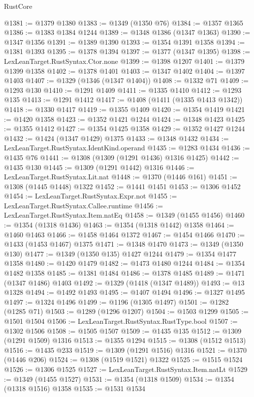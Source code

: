 \begin{lexlean}{RustCore}
\begin{coremodule}
@1381 := @1379 @1380
@1383 := @1349 (@1350 @76)
@1384 := @1357 @1365
@1386 := @1383 @1384 @1244
@1389 := @1348 @1386 (@1347 @1363)
@1390 := @1347 @1356
@1391 := @1389 @1390
@1393 := @1354 @1391 @1358
@1394 := @1381 @1393
@1395 := @1378 @1394
@1397 := @1377 (@1347 @1395)
@1398 := LexLeanTarget.RustSyntax.Ctor.none
@1399 := @1398 @1207
@1401 := @1379 @1399 @1358
@1402 := @1378 @1401
@1403 := @1347 @1402
@1404 := @1397 @1403
@1407 := @1329 (@1346 (@1347 @1404))
@1408 := @1332 @71
@1409 := @1293 @130
@1410 := @1291 @1409
@1411 := @1335 @1410
@1412 := @1293 @135
@1413 := @1291 @1412
@1417 := @1408 (@1411 (@1335 @1413 @1342))
@1418 := @1330 @1417
@1419 := @1355 @1409
@1420 := @1354 @1419
@1421 := @1420 @1358
@1423 := @1352 @1421 @1244
@1424 := @1348 @1423
@1425 := @1355 @1412
@1427 := @1354 @1425 @1358
@1429 := @1352 @1427 @1244
@1432 := @1424 (@1347 @1429) @1375
@1433 := @1348 @1432
@1434 := LexLeanTarget.RustSyntax.IdentKind.operand
@1435 := @1283 @1434
@1436 := @1435 @76
@1441 := @1308 (@1309 (@1291 @1436) @1316 @1425)
@1442 := @1435 @130
@1445 := @1309 (@1291 @1442) @1316
@1446 := LexLeanTarget.RustSyntax.Lit.nat
@1448 := @1370 (@1446 @161)
@1451 := @1308 (@1445 @1448) @1322
@1452 := @1441 @1451
@1453 := @1306 @1452
@1454 := LexLeanTarget.RustSyntax.Expr.not
@1455 := LexLeanTarget.RustSyntax.Callee.runtime
@1456 := LexLeanTarget.RustSyntax.Item.natEq
@1458 := @1349 (@1455 @1456)
@1460 := @1354 (@1318 @1436)
@1463 := @1354 (@1318 @1442) @1358
@1464 := @1460 @1463
@1466 := @1458 @1464 @1372
@1467 := @1454 @1466
@1470 := @1433 (@1453 @1467) @1375
@1471 := @1348 @1470
@1473 := @1349 (@1350 @130)
@1477 := @1349 (@1350 @135) @1427 @1244
@1479 := @1354 @1477 @1358
@1480 := @1420 @1479
@1482 := @1473 @1480 @1244
@1484 := @1354 @1482 @1358
@1485 := @1381 @1484
@1486 := @1378 @1485
@1489 := @1471 (@1347 @1486) @1403
@1492 := @1329 (@1418 (@1347 @1489))
@1493 := @13 @1328
@1494 := @1492 @1493
@1495 := @1407 @1494
@1496 := @1327 @1495
@1497 := @1324 @1496
@1499 := @1196 (@1305 @1497)
@1501 := @1282 (@1285 @71)
@1503 := @1289 (@1296 @1207)
@1504 := @1503 @1299
@1505 := @1501 @1504
@1506 := LexLeanTarget.RustSyntax.RustType.bool
@1507 := @1302 @1506
@1508 := @1505 @1507
@1509 := @1435 @135
@1512 := @1309 (@1291 @1509) @1316
@1513 := @1355 @1294
@1515 := @1308 (@1512 @1513)
@1516 := @1435 @233
@1519 := @1309 (@1291 @1516) @1316
@1521 := @1370 (@1446 @206)
@1524 := @1308 (@1519 @1521) @1322
@1525 := @1515 @1524
@1526 := @1306 @1525
@1527 := LexLeanTarget.RustSyntax.Item.natLt
@1529 := @1349 (@1455 @1527)
@1531 := @1354 (@1318 @1509)
@1534 := @1354 (@1318 @1516) @1358
@1535 := @1531 @1534

\end{coremodule}
\end{lexlean}
